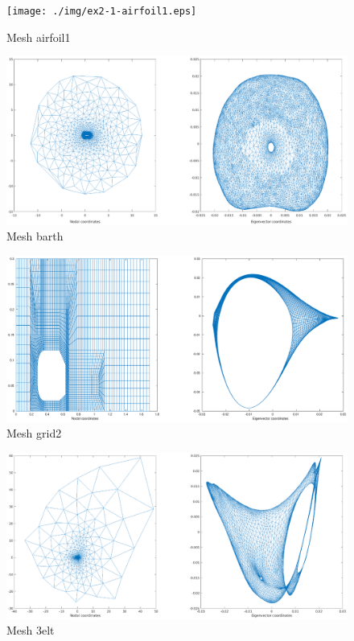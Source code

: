 \documentclass[unicode,11pt,a4paper,oneside,numbers=endperiod,openany]{scrartcl}
\begin{document}
\begin{figure}[H]
    \centering
    \caption{Mesh airfoil1}
    \label{fig:ex2-1-airfoil1}
    \texttt{[image: ./img/ex2-1-airfoil1.eps]}
\end{figure}

\begin{figure}[H]
    \centering
    \caption{Mesh barth}
    \label{fig:ex2-1-barth}
    \includegraphics[width=\textwidth, trim={7cm 1cm 7cm 0cm}]{./img/ex2-1-barth.eps}
\end{figure}

\begin{figure}[H]
    \centering
    \caption{Mesh grid2}
    \label{fig:ex2-1-grid2}
    \includegraphics[width=\textwidth, trim={7cm 3cm 7cm 0cm}]{./img/ex2-1-grid2.eps}
\end{figure}

\begin{figure}[H]
    \centering
    \caption{Mesh 3elt}
    \label{fig:ex2-1-3elt}
    \includegraphics[width=\textwidth, trim={7cm 0cm 7cm 0cm}]{./img/ex2-1-3elt.eps}
\end{figure}
\end{document}
